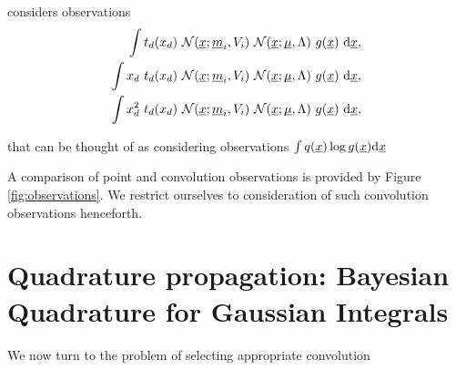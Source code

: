 \documentclass[twoside]{article}
\begin{document}
\ep considers observations
\begin{align*}
 \int t_d(x_d)~\N{\vx}{\vm_i}{V_i}~\N{\vx}{\vmu}{\Lambda}~g(\vx)~\ud \vx,\\
  \int x_d~t_d(x_d)~\N{\vx}{\vm_i}{V_i}~\N{\vx}{\vmu}{\Lambda}~g(\vx)~\ud \vx,\\
 \int x_d^2~t_d(x_d)~\N{\vx}{\vm_i}{V_i}~\N{\vx}{\vmu}{\Lambda}~g(\vx)~\ud \vx,
\end{align*}

that \vb can be thought of as considering observations $\int q(\vx) \log g(\vx) \ud\vx$


A comparison of point and convolution observations is provided by Figure \ref{fig:observations}. 
We restrict ourselves to consideration of such convolution observations henceforth.


\section{Quadrature propagation: Bayesian Quadrature for Gaussian Integrals}
\label{sec:active}

We now turn to the problem of selecting appropriate convolution 



\end{document}
